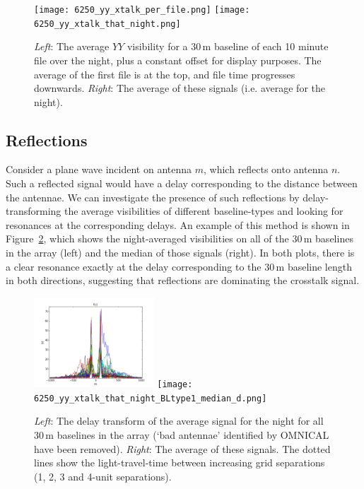 \documentclass[10pt,a4paper,notitlepage]{article}
\begin{document}
\begin{figure}
\centering
\texttt{[image: 6250\_yy\_xtalk\_per\_file.png]}
\texttt{[image: 6250\_yy\_xtalk\_that\_night.png]}
\caption{\textit{Left}: The average $YY$ visibility for a 30\,m baseline of each 10 minute file over the night, plus a constant offset for display purposes. The average of the first file is at the top, and file time progresses downwards. \textit{Right}: The average of these signals (i.e. average for the night).}
\label{fig:xtalk-per-file}
\end{figure}

\subsection{Reflections}
Consider a plane wave incident on antenna $m$, which reflects onto antenna $n$. Such a reflected signal would have a delay corresponding to the distance between the antennae. We can investigate the presence of such reflections by delay-transforming the average visibilities of different baseline-types and looking for resonances at the corresponding delays. An example of this method is shown in Figure~\ref{fig:xtalk-for-BL1}, which shows the night-averaged visibilities on all of the 30\,m baselines in the array (left) and the median of those signals (right). In both plots, there is a clear resonance exactly at the delay corresponding to the 30\,m baseline length in both directions, suggesting that reflections are dominating the crosstalk signal.\\

\begin{figure}
\centering
\includegraphics[width=0.4\textwidth]{6250_yy_xtalk_that_night_BLtype1_d.png}
\texttt{[image: 6250\_yy\_xtalk\_that\_night\_BLtype1\_median\_d.png]}
\caption{\textit{Left}: The delay transform of the average signal for the night for all 30\,m baselines in the array (`bad antennae' identified by OMNICAL have been removed). \textit{Right}: The average of these signals. The dotted lines show the light-travel-time between increasing grid separations (1, 2, 3 and 4-unit separations).}
\label{fig:xtalk-for-BL1}
\end{figure}
\end{document}
